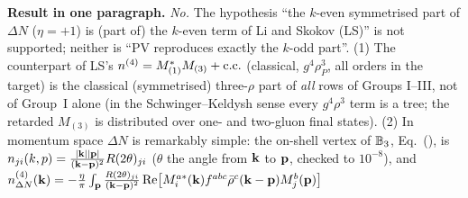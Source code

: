 \noindent\textbf{Result in one paragraph.}
\emph{No.} The hypothesis ``the $k$-even symmetrised part of $\Delta N$ ($\eta=+1$) is (part of) the $k$-even term of Li and Skokov (LS)'' is not supported; neither is ``PV reproduces exactly the $k$-odd part''. (1) The counterpart of LS's $n^{(4)}=M_{(1)}^*M_{(3)}+{\rm c.c.}$ (classical, $g^4\rho_P^3$, all orders in the target) is the classical (symmetrised) three-$\rho$ part of \emph{all} rows of Groups I--III, not of Group~I alone (in the Schwinger--Keldysh sense every $g^4\rho^3$ term is a tree; the retarded $M_{(3)}$ is distributed over one- and two-gluon final states). (2) In momentum space $\Delta N$ is remarkably simple: the on-shell vertex of $\mathbb{B}_3$, Eq.~(), is $n_{ji}(k,p)=\frac{|\mathbf{k}||\mathbf{p}|}{(\mathbf{k}-\mathbf{p})^2}R(2\theta)_{ji}$ ($\theta$ the angle from $\mathbf{k}$ to $\mathbf{p}$, checked to $10^{-8}$), and
$n^{(4)}_{\Delta N}(\mathbf{k})=-\frac\eta\pi\int_{\mathbf{p}}\frac{R(2\theta)_{ji}}{(\mathbf{k}-\mathbf{p})^2}\,{\rm Re}\big[M^{a*}_i(\mathbf{k})f^{abc}\bar\rho^c(\mathbf{k}-\mathbf{p})M^b_j(\mathbf{p})\big]$
